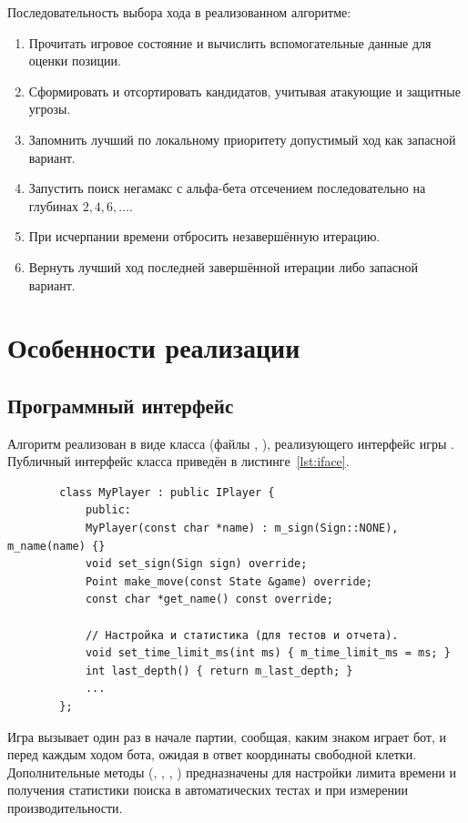 \documentclass[14pt,a4paper]{extarticle}
\begin{document}
	Последовательность выбора хода в реализованном алгоритме:
	\begin{enumerate}[leftmargin=1.9cm,itemsep=0pt,topsep=3pt]
		\item Прочитать игровое состояние и вычислить вспомогательные данные для оценки позиции.
		\item Сформировать и отсортировать кандидатов, учитывая атакующие и защитные угрозы.
		\item Запомнить лучший по локальному приоритету допустимый ход как запасной вариант.
		\item Запустить поиск негамакс с альфа-бета отсечением последовательно на глубинах $2,4,6,\ldots$.
		\item При исчерпании времени отбросить незавершённую итерацию.
		\item Вернуть лучший ход последней завершённой итерации либо запасной вариант.
	\end{enumerate}
	
	
	\section{Особенности реализации}\label{sec:impl}
	
	\subsection{Программный интерфейс}
	
	Алгоритм реализован в виде класса  (файлы , ), реализующего интерфейс игры . Публичный интерфейс класса приведён в листинге~\ref{lst:iface}.
	
	\label{lst:iface}
	\begin{verbatim}
		class MyPlayer : public IPlayer {
			public:
			MyPlayer(const char *name) : m_sign(Sign::NONE), m_name(name) {}
			void set_sign(Sign sign) override;
			Point make_move(const State &game) override;
			const char *get_name() const override;
			
			// Настройка и статистика (для тестов и отчета).
			void set_time_limit_ms(int ms) { m_time_limit_ms = ms; }
			int last_depth() { return m_last_depth; }
			...
		};
	\end{verbatim}
	
	Игра вызывает  один раз в начале партии, сообщая, каким знаком играет бот, и  перед каждым ходом бота, ожидая в ответ координаты свободной клетки. Дополнительные методы (, , , ) предназначены для настройки лимита времени и получения статистики поиска в автоматических тестах и при измерении производительности.
	
\end{document}
